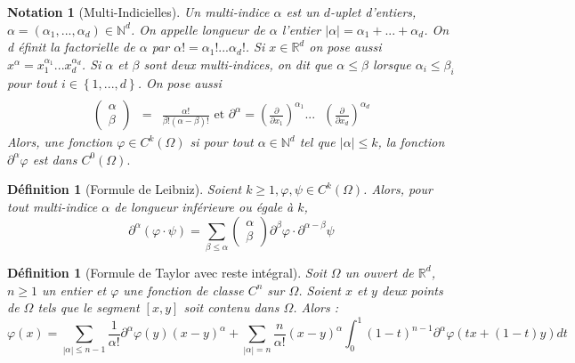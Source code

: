 \documentclass[3pt]{article}
\newtheorem{definition}[theorem]{D\'{e}finition}
\newtheorem{notation}[theorem]{Notation}
\begin{document}
\bigskip

\begin{notation}[Multi-Indicielles]
Un multi-indice $\alpha $ est un $d$-uplet d'entiers, $\alpha =(\alpha
_{1},...,\alpha _{d})\in \mathbb{N}^{d}$. On appelle longueur de $\alpha $
l'entier $\left\vert \alpha \right\vert =\alpha _{1}+...+\alpha _{d}$. On d%
\'{e}finit la factorielle de $\alpha $ par $\alpha !=\alpha _{1}!...\alpha
_{d}!$. Si $x\in \mathbb{R}^{d}$ on pose aussi $x^{\alpha }=x_{1}^{\alpha
_{1}}...x_{d}^{\alpha _{d}}$. Si $\alpha $ et $\beta $ sont deux
multi-indices, on dit que $\alpha \leq \beta $ lorsque $\alpha _{i}\leq
\beta _{i}$ pour tout $i\in \left\{ 1,...,d\right\} $. On pose aussi%
\begin{eqnarray*}
&& \\
\begin{pmatrix}
\alpha \\ 
\beta%
\end{pmatrix}
&=&\frac{\alpha !}{\beta !(\alpha -\beta )!}\text{ \ \ \ \ et \ \ \ }%
\partial ^{\alpha }=\left( \frac{\partial }{\partial x_{1}}\right) ^{\alpha
_{1}}...\text{ }\left( \frac{\partial }{\partial x_{d}}\right) ^{\alpha _{d}}
\end{eqnarray*}%
Alors, une fonction $\varphi \in C^{k}(\Omega )$ si pour tout $\alpha \in 
\mathbb{N}^{d}$ tel que $\left\vert \alpha \right\vert \leq k$, la fonction $%
\partial ^{\alpha }\varphi $ est dans $C^{0}(\Omega ).$
\end{notation}

\bigskip

\begin{definition}[Formule de Leibniz]
Soient $k\geq 1,\varphi ,\psi \in C^{k}(\Omega )$. Alors, pour tout
multi-indice $\alpha $ de longueur inf\'{e}rieure ou \'{e}gale \`{a} $k$,%
\begin{equation*}
\partial ^{\alpha }\left( \varphi \cdot \psi \right) =\sum_{\beta \leq
\alpha }%
\begin{pmatrix}
\alpha \\ 
\beta%
\end{pmatrix}%
\partial ^{\beta }\varphi \cdot \partial ^{\alpha -\beta }\psi
\end{equation*}
\end{definition}

\bigskip

\begin{definition}[Formule de Taylor avec reste int\'{e}gral]
Soit $\Omega $ un ouvert de $\mathbb{R}^{d}$, $n\geq 1$ un entier et $%
\varphi $ une fonction de classe $C^{n}$ sur $\Omega $. Soient $x$ et $y$
deux points de $\Omega $ tels que le segment $[x,y]$ soit contenu dans $%
\Omega $. Alors :%
\begin{equation*}
\varphi (x)=\sum_{\left\vert \alpha \right\vert \leq n-1}\frac{1}{\alpha !}%
\partial ^{\alpha }\varphi (y)(x-y)^{\alpha }+\sum_{\left\vert \alpha
\right\vert =n}\frac{n}{\alpha !}(x-y)^{\alpha
}\int_{0}^{1}(1-t)^{n-1}\partial ^{\alpha }\varphi (tx+(1-t)y)dt
\end{equation*}
\end{definition}
\end{document}
